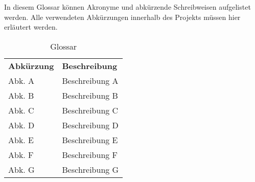\begin{tcolorbox}
	In diesem Glossar können Akronyme und abkürzende Schreibweisen aufgelistet werden. 
	Alle verwendeten Abkürzungen innerhalb des Projekts müssen hier erläutert werden.
\end{tcolorbox}

\begin{table}[h]
	\centering
	\begin{tabularx}{\textwidth}{X X}
		\rowcolor[HTML]{C0C0C0} 
		\textbf{Abkürzung} & \textbf{Beschreibung} \\
		Abk. A & Beschreibung A \\
		\rowcolor[HTML]{E7E7E7} 
		Abk. B & Beschreibung B \\
		Abk. C & Beschreibung C \\
		\rowcolor[HTML]{E7E7E7} 
		Abk. D & Beschreibung D \\
		Abk. E & Beschreibung E \\
		\rowcolor[HTML]{E7E7E7} 
		Abk. F & Beschreibung F \\
		Abk. G & Beschreibung G
	\end{tabularx}
	\caption{Glossar}
	\label{table:glossar}
\end{table}